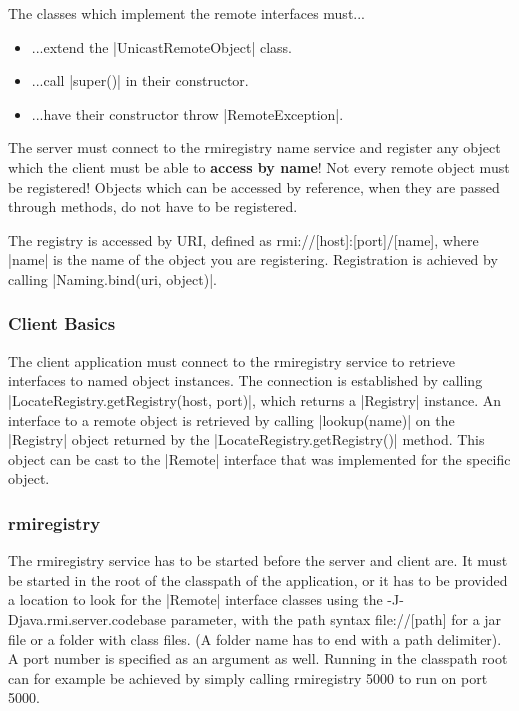 \documentclass[a4paper]{article}
\begin{document}
The classes which implement the remote interfaces must...

\begin{itemize}
\item ...extend the |UnicastRemoteObject| class.
\item ...call |super()| in their constructor.
\item ...have their constructor throw |RemoteException|.
\end{itemize}

The server must connect to the rmiregistry name service and register any object which the client must be able to \textbf{access by name}! Not every remote object must be registered! Objects which can be accessed by reference, when they are passed through methods, do not have to be registered.

The registry is accessed by URI, defined as {\small\ttfamily rmi://[host]:[port]/[name]}, where |name| is the name of the object you are registering. Registration is achieved by calling |Naming.bind(uri, object)|.

\subsubsection{Client Basics}

The client application must connect to the rmiregistry service to retrieve interfaces to named object instances. The connection is established by calling |LocateRegistry.getRegistry(host, port)|, which returns a |Registry| instance. An interface to a remote object is retrieved by calling |lookup(name)| on the |Registry| object returned by the |LocateRegistry.getRegistry()| method. This object can be cast to the |Remote| interface that was implemented for the specific object.

\subsubsection{rmiregistry}

The rmiregistry service has to be started before the server and client are. It must be started in the root of the classpath of the application, or it has to be provided a location to look for the |Remote| interface classes using the {\small\ttfamily -J-Djava.rmi.server.codebase} parameter, with the path syntax {\small\ttfamily file://[path]} for a jar file or a folder with class files. (A folder name has to end with a path delimiter). A port number is specified as an argument as well. Running in the classpath root can for example be achieved by simply calling {\small\ttfamily rmiregistry 5000} to run on port 5000.
\end{document}
